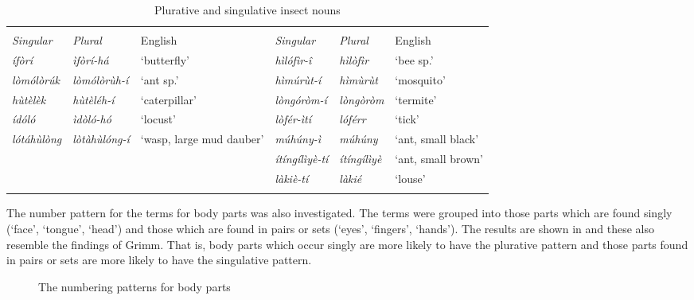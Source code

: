 \documentclass[output=paper]{langsci/langscibook}
\begin{document}
\begin{table}
\begin{tabularx}{\textwidth}{>{\itshape}l>{\itshape}lX>{\itshape}l>{\itshape}lX}
\lsptoprule

\multicolumn{3}{c}{\textup{Plurative}} & \multicolumn{3}{c}{\textup{Singulative}}\\ \cmidrule(lr){1-3}\cmidrule(lr){4-6}
  \textup{Singular} &  \textup{Plural} &  {English} &  \textup{Singular} &  \textup{Plural} &  {English}\\
\midrule
 ífòrí &  ìfòrí-há & ‘butterfly’ &  hìlófìr-î &  hìlòfìr & ‘bee sp.’\\
\tablevspace
 lòmólòrúk &  lòmólòrùh-í & ‘ant sp.’ &  hìmúrùt-í &  hìmùrùt & ‘mosquito’\\
\tablevspace
 hùtèlèk &  hùtèléh-í & ‘caterpillar’ &  lòngóròm-í &  lòngòròm & ‘termite’\\
\tablevspace
 ídóló &  ìdòló-hó & ‘locust’ &  lòfér-ìtí &  lóférr & ‘tick’\\
\tablevspace
 lótáhùlòng &  lòtàhùlóng-í & ‘wasp, large mud dauber’ &  múhúny-ì &  múhúny & ‘ant, small black’\\
\tablevspace
&  &  &  ítíngílìyè-tí &  ítíngílìyè & ‘ant, small brown’\\
\tablevspace
&  &  &  làkiè-tí &  làkié & ‘louse’\\
\lspbottomrule
\end{tabularx}
\caption{Plurative and singulative insect nouns}
\label{tab:moodie:7}
\end{table}

The number pattern for the terms for body parts was also investigated. The terms were grouped into those parts which are found singly (‘face’, ‘tongue’, ‘head’) and those which are found in pairs or sets (‘eyes’, ‘fingers’, ‘hands’). The results are shown in  and these also resemble the findings of Grimm.  That is, body parts which occur singly are more likely to have the plurative pattern and those parts found in pairs or sets are more likely to have the singulative pattern. 

\begin{figure}
\caption{The numbering patterns for body parts}
\label{fig:moodie:2}
\end{figure}
\end{document}
